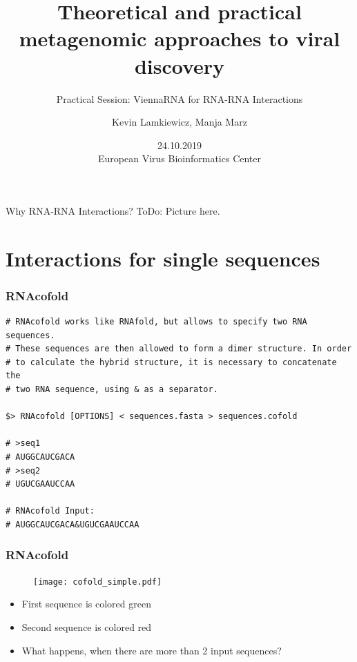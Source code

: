

\title{Theoretical and practical metagenomic approaches to viral discovery}
\subtitle{Practical Session: ViennaRNA for RNA-RNA Interactions}
\author{Kevin Lamkiewicz, Manja Marz}
\date{24.10.2019\\[1em]European Virus Bioinformatics Center}



\begin{frame}
  \maketitle
\end{frame}

\begin{frame}[c]{Why RNA-RNA Interactions?}
  ToDo: Picture here.
\end{frame}

\section[Sequences]{Interactions for single sequences}


\begin{frame}[c, fragile]\frametitle{RNAcofold}
  \begin{lstlisting}
# RNAcofold works like RNAfold, but allows to specify two RNA sequences.
# These sequences are then allowed to form a dimer structure. In order
# to calculate the hybrid structure, it is necessary to concatenate the
# two RNA sequence, using & as a separator.

$> RNAcofold [OPTIONS] < sequences.fasta > sequences.cofold

# >seq1
# AUGGCAUCGACA
# >seq2
# UGUCGAAUCCAA

# RNAcofold Input:
# AUGGCAUCGACA&UGUCGAAUCCAA
  \end{lstlisting}
\end{frame}

\begin{frame}[c]\frametitle{RNAcofold}
  \begin{minipage}[c]{0.4\textwidth}
  \begin{figure}
    \centering
    \texttt{[image: cofold\_simple.pdf]}
  \end{figure}
\end{minipage}\hfill\begin{minipage}[c]{0.55\textwidth}
  \begin{itemize}
    \item First sequence is colored green
    \item Second sequence is colored red\\[3em]
    \item<2-> What happens, when there are more than 2 input sequences? 
  \end{itemize}
\end{minipage}
\end{frame}

